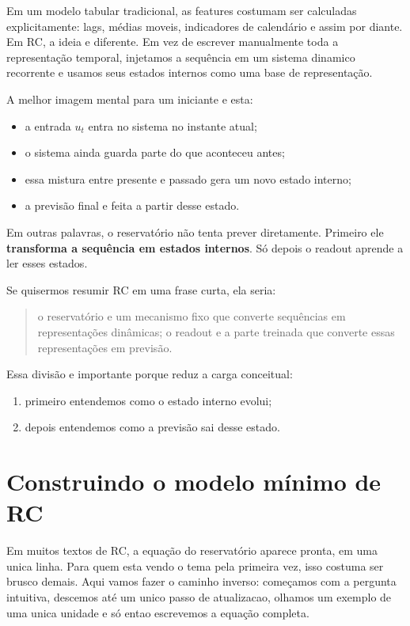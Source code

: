 \documentclass[12pt]{article}
\providecommand{\tightlist}{%
              \setlength{\itemsep}{0pt}\setlength{\parskip}{0pt}}
\begin{document}
Em um modelo tabular tradicional, as features costumam ser calculadas explicitamente: lags, médias moveis, indicadores de calendário e assim por diante. Em RC, a ideia e diferente. Em vez de escrever manualmente toda a representação temporal, injetamos a sequência em um sistema dinamico recorrente e usamos seus estados internos como uma base de representação.

A melhor imagem mental para um iniciante e esta:

\begin{itemize}
\tightlist
\item
  a entrada \(u_t\) entra no sistema no instante atual;
\item
  o sistema ainda guarda parte do que aconteceu antes;
\item
  essa mistura entre presente e passado gera um novo estado interno;
\item
  a previsão final e feita a partir desse estado.
\end{itemize}

Em outras palavras, o reservatório não tenta prever diretamente. Primeiro ele \textbf{transforma a sequência em estados internos}. Só depois o readout aprende a ler esses estados.

Se quisermos resumir RC em uma frase curta, ela seria:

\begin{quote}
o reservatório e um mecanismo fixo que converte sequências em representações dinâmicas; o readout e a parte treinada que converte essas representações em previsão.
\end{quote}

Essa divisão e importante porque reduz a carga conceitual:

\begin{enumerate}
\def\labelenumi{\arabic{enumi}.}
\tightlist
\item
  primeiro entendemos como o estado interno evolui;
\item
  depois entendemos como a previsão sai desse estado.
\end{enumerate}

\section{Construindo o modelo mínimo de RC}\label{3-construindo-o-modelo-muxednimo-de-rc}

Em muitos textos de RC, a equação do reservatório aparece pronta, em uma unica linha. Para quem esta vendo o tema pela primeira vez, isso costuma ser brusco demais. Aqui vamos fazer o caminho inverso: começamos com a pergunta intuitiva, descemos até um unico passo de atualizacao, olhamos um exemplo de uma unica unidade e só entao escrevemos a equação completa.
\end{document}
